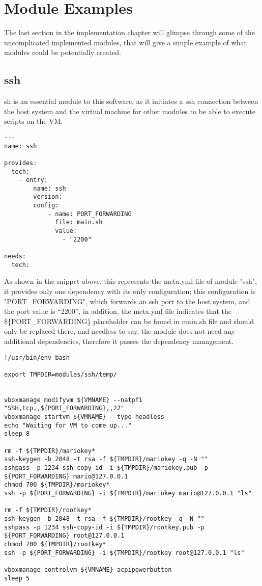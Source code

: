 \section{Module Examples}
The last section in the implementation chapter will glimpse through some of the uncomplicated implemented modules, that will give a simple example of what modules could be potentially created.

\subsection{ssh}
sh is an essential module to this software, as it initiates a ssh connection between the host system and the virtual machine for other modules to be able to execute scripts on the VM.

\begin{lstlisting}[caption=ssh metadata, style=pythonstyle]
---
name: ssh

provides:
  tech:
    - entry:
        name: ssh
        version:
        config:
            - name: PORT_FORWARDING
              file: main.sh
              value:
                - "2200"

needs:
  tech:
\end{lstlisting}

As shown in the snippet above, this represents the meta.yml file of module "ssh", it provides only one dependency with its only configuration; this configuration is "PORT\_FORWARDING", which forwards an ssh port to the host system, and the port value is “2200”, in addition, the meta.yml file indicates that the \$\{PORT\_FORWARDING\} placeholder can be found in main.sh file and should only be replaced there, and needless to say, the module does not need any additional dependencies, therefore it passes the dependency management.

\clearpage

\begin{lstlisting}[caption=ssh main.sh, style=pythonstyle]
!/usr/bin/env bash

export TMPDIR=modules/ssh/temp/


vboxmanage modifyvm ${VMNAME} --natpf1 "SSH,tcp,,${PORT_FORWARDING},,22"
vboxmanage startvm ${VMNAME} --type headless
echo "Waiting for VM to come up..."
sleep 8

rm -f ${TMPDIR}/mariokey*
ssh-keygen -b 2048 -t rsa -f ${TMPDIR}/mariokey -q -N ""
sshpass -p 1234 ssh-copy-id -i ${TMPDIR}/mariokey.pub -p ${PORT_FORWARDING} mario@127.0.0.1
chmod 700 ${TMPDIR}/mariokey*
ssh -p ${PORT_FORWARDING} -i ${TMPDIR}/mariokey mario@127.0.0.1 "ls"

rm -f ${TMPDIR}/rootkey*
ssh-keygen -b 2048 -t rsa -f ${TMPDIR}/rootkey -q -N ""
sshpass -p 1234 ssh-copy-id -i ${TMPDIR}/rootkey.pub -p ${PORT_FORWARDING} root@127.0.0.1
chmod 700 ${TMPDIR}/rootkey*
ssh -p ${PORT_FORWARDING} -i ${TMPDIR}/rootkey root@127.0.0.1 "ls"

vboxmanage controlvm ${VMNAME} acpipowerbutton
sleep 5
\end{lstlisting}

